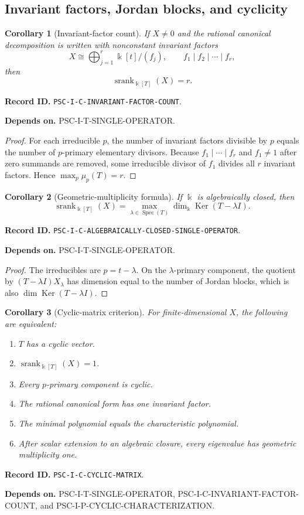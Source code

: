\documentclass[11pt]{article}
\newtheorem{corollary}[corollary]{Corollary}
\theoremstyle{definition}
\theoremstyle{remark}
\newcommand{\bbk}{\Bbbk}
\newcommand{\srank}{\operatorname{srank}}
\newcommand{\Ker}{\operatorname{Ker}}
\newcommand{\RecordID}[1]{\par\smallskip\noindent\begingroup\footnotesize\color{PSCGray}\raggedright\textbf{Record ID.} \nolinkurl{#1}.\par\endgroup}
\newcommand{\Depends}[1]{\par\noindent\begingroup\footnotesize\color{PSCGray}\raggedright\textbf{Depends on.} #1\par\endgroup}
\begin{document}
\subsection{Invariant factors, Jordan blocks, and cyclicity}
\begin{corollary}[Invariant-factor count]
\label{cor:invariant-factor-count}
If $X\neq0$ and the rational canonical decomposition is written with nonconstant invariant factors
\[
X\cong\bigoplus_{j=1}^{r}\bbk[t]/(f_j),
\qquad
f_1\mid f_2\mid\cdots\mid f_r,
\]
then
\[
\boxed{\srank_{\bbk[T]}(X)=r.}
\]
\end{corollary}
\RecordID{PSC-I-C-INVARIANT-FACTOR-COUNT}
\Depends{PSC-I-T-SINGLE-OPERATOR.}

\begin{proof}
For each irreducible $p$, the number of invariant factors divisible by $p$ equals the number of $p$-primary elementary divisors.  Because $f_1\mid\cdots\mid f_r$ and $f_1\neq1$ after zero summands are removed, some irreducible divisor of $f_1$ divides all $r$ invariant factors.  Hence $\max_p\mu_p(T)=r$.
\end{proof}

\begin{corollary}[Geometric-multiplicity formula]
\label{cor:geometric-multiplicity}
If $\bbk$ is algebraically closed, then
\[
\boxed{
\srank_{\bbk[T]}(X)
=
\max_{\lambda\in\operatorname{Spec}(T)}
\dim_{\bbk}\Ker(T-\lambda I).
}
\]
\end{corollary}
\RecordID{PSC-I-C-ALGEBRAICALLY-CLOSED-SINGLE-OPERATOR}
\Depends{PSC-I-T-SINGLE-OPERATOR.}

\begin{proof}
The irreducibles are $p=t-\lambda$.  On the $\lambda$-primary component, the quotient by $(T-\lambda I)X_\lambda$ has dimension equal to the number of Jordan blocks, which is also $\dim\Ker(T-\lambda I)$.
\end{proof}

\begin{corollary}[Cyclic-matrix criterion]
\label{cor:cyclic-matrix}
For finite-dimensional $X$, the following are equivalent:
\begin{enumerate}[label=(\roman*)]
\item $T$ has a cyclic vector.
\item $\srank_{\bbk[T]}(X)=1$.
\item Every $p$-primary component is cyclic.
\item The rational canonical form has one invariant factor.
\item The minimal polynomial equals the characteristic polynomial.
\item After scalar extension to an algebraic closure, every eigenvalue has geometric multiplicity one.
\end{enumerate}
\end{corollary}
\RecordID{PSC-I-C-CYCLIC-MATRIX}
\Depends{PSC-I-T-SINGLE-OPERATOR, PSC-I-C-INVARIANT-FACTOR-COUNT, and PSC-I-P-CYCLIC-CHARACTERIZATION.}
\end{document}
